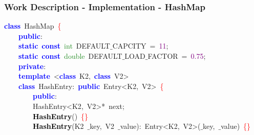\documentclass[table, usenames,dvipsnames,svgnames]{beamer}
\begin{document}
\begin{frame}

\frametitle{Work Description - Implementation - HashMap}




\pause
\vspace{-2mm}
\begin{center}\begin{minipage}{90mm}
\begin{block}
\noindent
\mbox{}\textbf{\textcolor{Blue}{class}}\ \textcolor{TealBlue}{HashMap}\ \textcolor{Red}{\{} \\
\mbox{}\ \ \ \ \textbf{\textcolor{Blue}{public}}\textcolor{BrickRed}{:} \\
\mbox{}\ \ \ \ \textbf{\textcolor{Blue}{static}}\ \textbf{\textcolor{Blue}{const}}\ \textcolor{ForestGreen}{int}\ DEFAULT$\_$CAPCITY\ \textcolor{BrickRed}{=}\ \textcolor{Purple}{11}\textcolor{BrickRed}{;} \\
\mbox{}\ \ \ \ \textbf{\textcolor{Blue}{static}}\ \textbf{\textcolor{Blue}{const}}\ \textcolor{ForestGreen}{double}\ DEFAULT$\_$LOAD$\_$FACTOR\ \textcolor{BrickRed}{=}\ \textcolor{Purple}{0.75}\textcolor{BrickRed}{;} \\
\mbox{}\ \ \ \ \textbf{\textcolor{Blue}{private}}\textcolor{BrickRed}{:} \\
\mbox{}\ \ \ \ \textbf{\textcolor{Blue}{template}}\ \textcolor{BrickRed}{\textless{}}\textbf{\textcolor{Blue}{class}}\ \textcolor{TealBlue}{K2}\textcolor{BrickRed}{,}\ \textbf{\textcolor{Blue}{class}}\ \textcolor{TealBlue}{V2}\textcolor{BrickRed}{\textgreater{}} \\
\mbox{}\ \ \ \ \textbf{\textcolor{Blue}{class}}\ \textcolor{TealBlue}{HashEntry}\textcolor{BrickRed}{:}\ \textbf{\textcolor{Blue}{public}}\ Entry\textcolor{BrickRed}{\textless{}}K2\textcolor{BrickRed}{,}\ V2\textcolor{BrickRed}{\textgreater{}}\ \textcolor{Red}{\{} \\
\mbox{}\ \ \ \ \ \ \ \ \textbf{\textcolor{Blue}{public}}\textcolor{BrickRed}{:} \\
\mbox{}\ \ \ \ \ \ \ \ HashEntry\textcolor{BrickRed}{\textless{}}K2\textcolor{BrickRed}{,}\ V2\textcolor{BrickRed}{\textgreater{}*}\ next\textcolor{BrickRed}{;} \\
\mbox{}\ \ \ \ \ \ \ \ \textbf{\textcolor{Black}{HashEntry}}\textcolor{BrickRed}{()}\ \textcolor{Red}{\{\}} \\
\mbox{}\ \ \ \ \ \ \ \ \textbf{\textcolor{Black}{HashEntry}}\textcolor{BrickRed}{(}\textcolor{TealBlue}{K2}\ $\_$key\textcolor{BrickRed}{,}\ \textcolor{TealBlue}{V2}\ $\_$value\textcolor{BrickRed}{):}\ Entry\textcolor{BrickRed}{\textless{}}K2\textcolor{BrickRed}{,}\ V2\textcolor{BrickRed}{\textgreater{}(}$\_$key\textcolor{BrickRed}{,}\ $\_$value\textcolor{BrickRed}{)}\ \textcolor{Red}{\{\}} \\

\end{block}
\end{minipage}
\end{center}
\end{frame}
\end{document}

